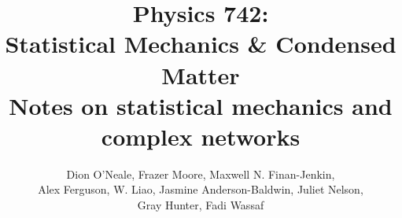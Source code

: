 \documentclass{article}
\begin{document}
\newcommand{\calG}{\mathcal{G}}
\title{Physics 742: \\
	Statistical Mechanics \& Condensed Matter\\
	Notes on statistical mechanics and complex networks}

\author{Dion O'Neale, Frazer Moore, Maxwell N. Finan-Jenkin, \\
Alex Ferguson, W. Liao, Jasmine Anderson-Baldwin, Juliet Nelson,\\
Gray Hunter, Fadi Wassaf}

\maketitle
\newpage
\tableofcontents
\newpage












\end{document}
